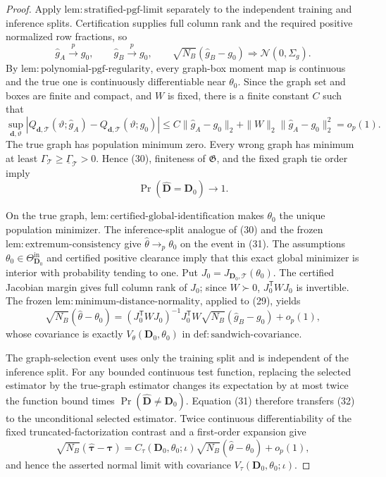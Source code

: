 \documentclass{article}
\begin{document}
\begin{proof}
Apply \(\mathrm{lem{:}stratified\text{-}pgf\text{-}limit}\) separately to the independent training and inference splits.  Certification supplies full column rank and the required positive normalized row fractions, so
\[
 \widehat g_A\overset p\longrightarrow g_0,
 \qquad
 \widehat g_B\overset p\longrightarrow g_0,
 \qquad
 \sqrt{N_B}(\widehat g_B-g_0)
 \Rightarrow\mathcal N(0,\Sigma_g). \tag{29}
\]
By \(\mathrm{lem{:}polynomial\text{-}pgf\text{-}regularity}\), every graph-box moment map is continuous and the true one is continuously differentiable near \(\theta_0\).  Since the graph set and boxes are finite and compact, and \(W\) is fixed, there is a finite constant \(C\) such that
\[
 \sup_{\boldsymbol d,\vartheta}
 \left|Q_{\boldsymbol d,\mathcal T}(\vartheta;\widehat g_A)
 -Q_{\boldsymbol d,\mathcal T}(\vartheta;g_0)\right|
 \leq C\|\widehat g_A-g_0\|_2+
 \|W\|_2\|\widehat g_A-g_0\|_2^2=o_p(1). \tag{30}
\]
The true graph has population minimum zero.  Every wrong graph has minimum at least
\(\Gamma_{\mathcal T}\geq\underline\Gamma_{\mathcal T}>0\).  Hence (30), finiteness of \(\mathfrak G\), and the fixed graph tie order imply
\[
 \Pr(\widehat{\boldsymbol D}=\boldsymbol D_0)\longrightarrow1. \tag{31}
\]

On the true graph, \(\mathrm{lem{:}certified\text{-}global\text{-}identification}\) makes \(\theta_0\) the unique population minimizer.  The inference-split analogue of (30) and the frozen \(\mathrm{lem{:}extremum\text{-}consistency}\) give \(\widehat\theta\to_p\theta_0\) on the event in (31).  The assumptions \(\theta_0\in\Theta^{\mathrm{in}}_{\boldsymbol D_0}\) and certified positive clearance imply that this exact global minimizer is interior with probability tending to one.  Put
\(J_0=J_{\boldsymbol D_0,\mathcal T}(\theta_0)\).  The certified Jacobian margin gives full column rank of \(J_0\); since \(W\succ0\), \(J_0^{\mathsf T}WJ_0\) is invertible.  The frozen \(\mathrm{lem{:}minimum\text{-}distance\text{-}normality}\), applied to (29), yields
\[
 \sqrt{N_B}(\widehat\theta-\theta_0)
 =(J_0^{\mathsf T}WJ_0)^{-1}J_0^{\mathsf T}W
 \sqrt{N_B}(\widehat g_B-g_0)+o_p(1), \tag{32}
\]
whose covariance is exactly \(V_\theta(\boldsymbol D_0,\theta_0)\) in \(\mathrm{def{:}sandwich\text{-}covariance}\).

The graph-selection event uses only the training split and is independent of the inference split.  For any bounded continuous test function, replacing the selected estimator by the true-graph estimator changes its expectation by at most twice the function bound times \(\Pr(\widehat{\boldsymbol D}\ne\boldsymbol D_0)\).  Equation (31) therefore transfers (32) to the unconditional selected estimator.  Twice continuous differentiability of the fixed truncated-factorization contrast and a first-order expansion give
\[
 \sqrt{N_B}(\widehat{\boldsymbol\tau}-\boldsymbol\tau)
 =C_\tau(\boldsymbol D_0,\theta_0;\iota)
 \sqrt{N_B}(\widehat\theta-\theta_0)+o_p(1),
\]
and hence the asserted normal limit with covariance
\(V_\tau(\boldsymbol D_0,\theta_0;\iota)\).


\end{proof}
\end{document}
